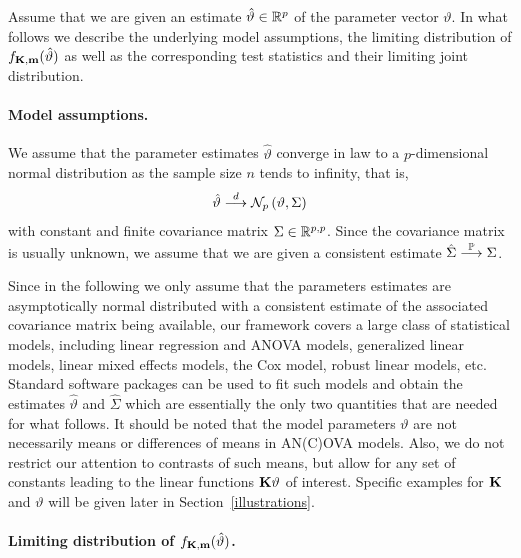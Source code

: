 \documentclass[12pt]{article}
\begin{document}
Assume that we are given
an estimate $\hat{\vartheta} \in \mathbb{R}^p$ of the parameter
vector $\vartheta$. In what follows we describe the underlying model assumptions,
the limiting distribution of $f_{\mathbf{K},\mathbf{m}}(\hat{\vartheta})$ as well as the 
corresponding test statistics and their limiting joint distribution.



\paragraph{Model assumptions.}

We assume that the parameter estimates $\hat{\vartheta}$ converge in law
to a $p$-dimensional normal distribution as the sample
size $n$ tends to infinity, that is,
\begin{eqnarray} \label{normality}
\hat{\vartheta} \stackrel{d}{\longrightarrow} \mathcal{N}_p\left(\vartheta, \Sigma\right)
\end{eqnarray}
with constant and finite covariance matrix $\Sigma \in \mathbb{R}^{p,p}$.
Since the covariance matrix is usually unknown, we assume
that we are given a consistent estimate $\hat{\Sigma} \stackrel{\mathbb{P}}{\longrightarrow} \Sigma$.

Since in the following we only assume that the parameters estimates are asymptotically normal
distributed with a consistent estimate of the associated covariance matrix
being available, our
framework covers a large class of statistical models, including linear
regression and ANOVA models, generalized linear models, linear mixed
effects models, the Cox model, robust linear models, etc.
Standard software packages can be used to fit such models
and obtain the estimates $\hat{\vartheta}$ and $\hat{\Sigma}$ which
are essentially the only two quantities that are needed for what follows.
It should be noted that the model parameters $\vartheta$ are not necessarily
means or differences of means in AN(C)OVA models.
Also, we do not restrict our attention to contrasts of such means, but allow for
any set of constants leading to the linear functions $\mathbf{K} \vartheta$ of interest.
Specific examples for $\mathbf{K}$ and $\vartheta$ will be given later in Section~\ref{illustrations}.



\paragraph{Limiting distribution of $f_{\mathbf{K},\mathbf{m}}(\hat{\vartheta})$.}
\end{document}
